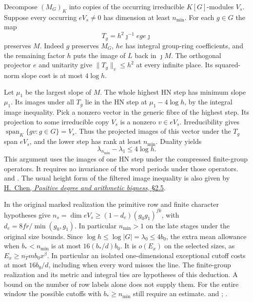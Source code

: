 Decompose \((M_G)_K\) into copies of the occurring irreducible
\(K[G]\)-modules \(V_s\). Suppose every occurring \(eV_s\ne0\)
has dimension at least \(n_{\min}\). For each \(g\in G\) the map
\[
               T_g=h^2\jmath^{-1}e g e\jmath
\]
preserves \(M\). Indeed \(g\) preserves \(M_G\), \(he\) has
integral group-ring coefficients, and the remaining factor \(h\)
puts the image of \(L\) back in \(\jmath M\). The orthogonal
projector \(e\) and unitarity give \(\|T_g\|_v\le h^2\) at every
infinite place. Its squared-norm slope cost is at most \(4\log h\).

Let \(\mu_1\) be the largest slope of \(M\). The whole highest HN
step has minimum slope \(\mu_1\). Its images under all \(T_g\) lie
in the HN step at \(\mu_1-4\log h\), by the integral image
inequality. Pick a nonzero vector in the generic fibre of the
highest step. Its projection to some irreducible copy \(V_s\)
is a nonzero \(v\in eV_s\). Irreducibility gives
\(\operatorname{span}_K\{gv:g\in G\}=V_s\). Thus the projected
images of this vector under the \(T_g\) span \(eV_s\), and the
lower step has rank at least \(n_{\min}\). Duality yields
\[
             \lambda_{n_{\min}}-\lambda_1\le4\log h .
\]
This argument uses the images of one HN step under the compressed
finite-group operators. It requires no invariance of the word periods
under those operators.
and .
The usual height form of the filtered image inequality is also
given by \href{https://arxiv.org/abs/0803.2583}{H.~Chen,
\emph{Positive degree and arithmetic bigness}, \S2.5}.

In the original marked realization the primitive row and finite
character hypotheses give
\(n_s=\dim eV_s\ge(1-d_e)(g_0g_1)^{fk}\), with
\(d_e=8fr/\min(g_0,g_1)\). In particular \(n_{\min}>1\) on the
late stages under the original size bounds. Since
\(\log h\le\log|G|=\lambda_0\le4b_0\), the extra mean allowance
when \(b_*<n_{\min}\) is at most \(16(b_*/d)b_0\).
It is \(o(E_x)\) on the selected sizes, as \(E_x\ge n_Tmb_0 x^\beta\).
In particular an isolated one-dimensional exceptional cutoff costs
at most \(16b_0/d\), including when every word misses the line.
The finite-group realization and its metric and integral ties are
hypotheses of this deduction. A bound on the number of row labels
alone does not supply them. For the entire window the possible
cutoffs with \(b_*\ge n_{\min}\) still require an estimate.
and ;
.

